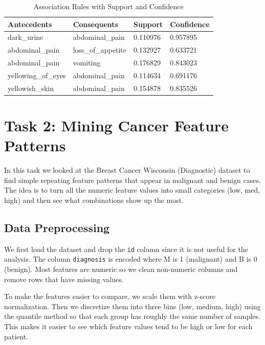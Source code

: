 \documentclass[12pt]{article}
\begin{document}
\begin{table}[ht]
\centering
\begin{tabular}{|l|l|l|l|}
\hline
\textbf{Antecedents}        & \textbf{Consequents}       & \textbf{Support} & \textbf{Confidence} \\ \hline
dark\_urine                 & abdominal\_pain            & 0.110976         & 0.957895           \\ \hline
abdominal\_pain             & loss\_of\_appetite         & 0.132927         & 0.633721           \\ \hline
abdominal\_pain             & vomiting                   & 0.176829         & 0.843023           \\ \hline
yellowing\_of\_eyes         & abdominal\_pain            & 0.114634         & 0.691176           \\ \hline
yellowish\_skin             & abdominal\_pain            & 0.154878         & 0.835526           \\ \hline
\end{tabular}
\caption{Association Rules with Support and Confidence}
\end{table} 

\pagebreak
\section{Task 2: Mining Cancer Feature Patterns}

In this task we looked at the Breast Cancer Wisconsin (Diagnostic) dataset to find simple repeating feature patterns that appear in malignant and benign cases. 
The idea is to turn all the numeric feature values into small categories (low, med, high) and then see what combinations show up the most.

\subsection{Data Preprocessing}
We first load the dataset and drop the \texttt{id} column since it is not useful for the analysis. 
The column \texttt{diagnosis} is encoded where M is 1 (malignant) and B is 0 (benign). 
Most features are numeric so we clean non-numeric columns and remove rows that have missing values.

To make the features easier to compare, we scale them with z-score normalization. 
Then we discretize them into three bins (low, medium, high) using the quantile method so that each group has roughly the same number of samples. 
This makes it easier to see which feature values tend to be high or low for each patient.
\end{document}
